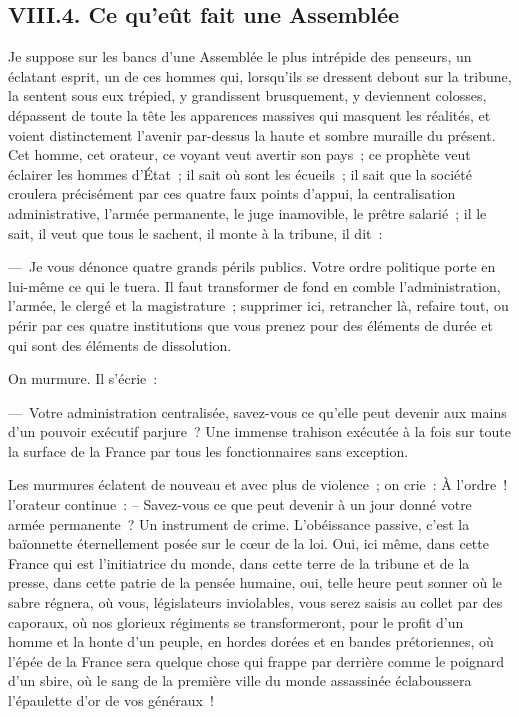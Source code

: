 \documentclass[french,twoside]{book} %
\begin{document}
\subsection[{VIII.4. Ce qu’eût fait une Assemblée}]{VIII.4. Ce qu’eût fait une Assemblée}
\noindent Je suppose sur les bancs d’une Assemblée le plus intrépide des penseurs, un éclatant esprit, un de ces hommes qui, lorsqu’ils se dressent debout sur la tribune, la sentent sous eux trépied, y grandissent brusquement, y deviennent colosses, dépassent de toute la tête les apparences massives qui masquent les réalités, et voient distinctement l’avenir par-dessus la haute et sombre muraille du présent. Cet homme, cet orateur, ce voyant veut avertir son pays ; ce prophète veut éclairer les hommes d’État ; il sait où sont les écueils ; il sait que la société croulera précisément par ces quatre faux points d’appui, la centralisation administrative, l’armée permanente, le juge inamovible, le prêtre salarié ; il le sait, il veut que tous le sachent, il monte à la tribune, il dit :\par
— Je vous dénonce quatre grands périls publics. Votre ordre politique porte en lui-même ce qui le tuera. Il faut transformer de fond en comble l’administration, l’armée, le clergé et la magistrature ; supprimer ici, retrancher là, refaire tout, ou périr par ces quatre institutions que vous prenez pour des éléments de durée et qui sont des éléments de dissolution.\par
On murmure. Il s’écrie :\par
— Votre administration centralisée, savez-vous ce qu’elle peut devenir aux mains d’un pouvoir exécutif parjure ? Une immense trahison exécutée à la fois sur toute la surface de la France par tous les fonctionnaires sans exception.\par
Les murmures éclatent de nouveau et avec plus de violence ; on crie : À l’ordre ! l’orateur continue : – Savez-vous ce que peut devenir à un jour donné votre armée permanente ? Un instrument de crime. L’obéissance passive, c’est la baïonnette éternellement posée sur le cœur de la loi. Oui, ici même, dans cette France qui est l’initiatrice du monde, dans cette terre de la tribune et de la presse, dans cette patrie de la pensée humaine, oui, telle heure peut sonner où le sabre régnera, où vous, législateurs inviolables, vous serez saisis au collet par des caporaux, où nos glorieux régiments se transformeront, pour le profit d’un homme et la honte d’un peuple, en hordes dorées et en bandes prétoriennes, où l’épée de la France sera quelque chose qui frappe par derrière comme le poignard d’un sbire, où le sang de la première ville du monde assassinée éclaboussera l’épaulette d’or de vos généraux !\par
\end{document}
